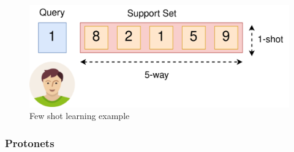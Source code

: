 \begin{figure}
    \centering
    \includegraphics[scale=0.25]{img/prerequisites/query_support.png}
    \caption{Few shot learning example}
    \label{fig:query_support}
\end{figure}



\subsubsection{Protonets}

